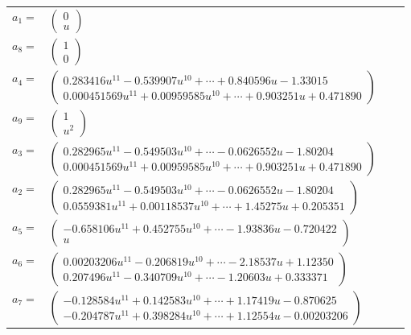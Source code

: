 \documentclass[1p]{elsarticle_modified}
\theoremstyle{definition}
\begin{document}
\begin{tabular}{m{7pt} m{180pt} m{7pt} m{180pt} }
\flushright $a_{1}=$&$\begin{pmatrix}0\\u\end{pmatrix}$ \\
\flushright $a_{8}=$&$\begin{pmatrix}1\\0\end{pmatrix}$ \\
\flushright $a_{4}=$&$\begin{pmatrix}0.283416 u^{11}-0.539907 u^{10}+\cdots+0.840596 u-1.33015\\0.000451569 u^{11}+0.00959585 u^{10}+\cdots+0.903251 u+0.471890\end{pmatrix}$ \\
\flushright $a_{9}=$&$\begin{pmatrix}1\\u^2\end{pmatrix}$ \\
\flushright $a_{3}=$&$\begin{pmatrix}0.282965 u^{11}-0.549503 u^{10}+\cdots-0.0626552 u-1.80204\\0.000451569 u^{11}+0.00959585 u^{10}+\cdots+0.903251 u+0.471890\end{pmatrix}$ \\
\flushright $a_{2}=$&$\begin{pmatrix}0.282965 u^{11}-0.549503 u^{10}+\cdots-0.0626552 u-1.80204\\0.0559381 u^{11}+0.00118537 u^{10}+\cdots+1.45275 u+0.205351\end{pmatrix}$ \\
\flushright $a_{5}=$&$\begin{pmatrix}-0.658106 u^{11}+0.452755 u^{10}+\cdots-1.93836 u-0.720422\\u\end{pmatrix}$ \\
\flushright $a_{6}=$&$\begin{pmatrix}0.00203206 u^{11}-0.206819 u^{10}+\cdots-2.18537 u+1.12350\\0.207496 u^{11}-0.340709 u^{10}+\cdots-1.20603 u+0.333371\end{pmatrix}$ \\
\flushright $a_{7}=$&$\begin{pmatrix}-0.128584 u^{11}+0.142583 u^{10}+\cdots+1.17419 u-0.870625\\-0.204787 u^{11}+0.398284 u^{10}+\cdots+1.12554 u-0.00203206\end{pmatrix}$ \\

\end{tabular}
\end{document}
